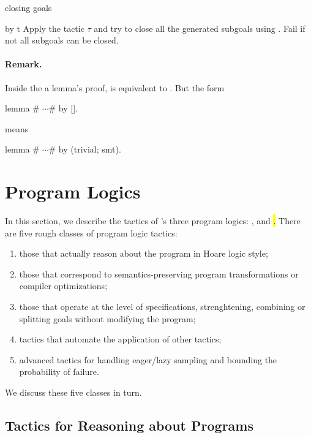 \begin{tactic}[by $\;\tau$]{closing goals}
  \begin{tsyntax}[empty]{by t}
  Apply the tactic $\tau$ and try to close all the generated subgoals using
  . Fail if not all subgoals can be closed.
  \end{tsyntax}

  \paragraph{Remark.} Inside the a lemma's proof,  is
  equivalent to .  But the form
\begin{easycrypt}{}{}
lemma #$\;\cdots$# by [].
\end{easycrypt}
  means
\begin{easycrypt}{}{}
lemma #$\;\cdots$# by (trivial; smt).
\end{easycrypt}
\end{tactic}

\section{Program Logics}
\label{sec:programlogics}

In this section, we describe the tactics of \EasyCrypt's three program
logics: \prhl, \phl and \hl.  There are five rough classes of program
logic tactics:
\begin{enumerate}
\item those that actually reason about the program in Hoare logic
  style;

\item those that correspond to semantics-preserving program
  transformations or compiler optimizations;

\item those that operate at the level of specifications,
  strenghtening, combining or splitting goals without modifying the
  program;

\item tactics that automate the application of other tactics;

\item advanced tactics for handling eager/lazy sampling and bounding
  the probability of failure.
\end{enumerate}
We discuss these five classes in turn.

\subsection{Tactics for Reasoning about Programs}
\label{subsec:reasoningprograms}

